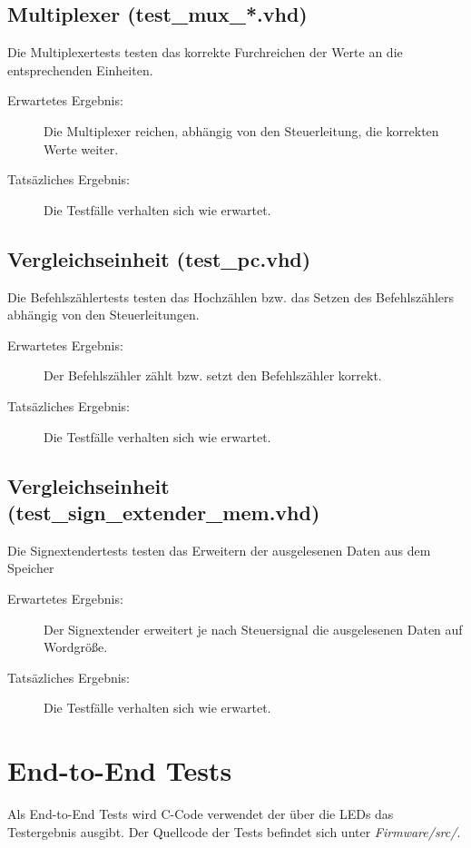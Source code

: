         \subsection{Multiplexer (test\_mux\_*.vhd)}
            Die Multiplexertests testen das korrekte Furchreichen der Werte an die
            entsprechenden Einheiten.
            \begin{description}
                \item[Erwartetes Ergebnis:] Die Multiplexer reichen, abhängig von den Steuerleitung, die korrekten
                Werte weiter.
                \item[Tatsäzliches Ergebnis:] Die Testfälle verhalten sich wie erwartet.
            \end{description}


        \subsection{Vergleichseinheit (test\_pc.vhd)}
            Die Befehlszählertests testen das Hochzählen bzw. das Setzen
            des Befehlszählers abhängig von den Steuerleitungen.
            \begin{description}
                \item[Erwartetes Ergebnis:] Der Befehlszähler zählt bzw. setzt
                den Befehlszähler korrekt. 
                \item[Tatsäzliches Ergebnis:] Die Testfälle verhalten sich wie erwartet.
            \end{description}

        \subsection{Vergleichseinheit (test\_sign\_extender\_mem.vhd)}
            Die Signextendertests testen das Erweitern der ausgelesenen Daten aus dem Speicher
            \begin{description}
                \item[Erwartetes Ergebnis:] Der Signextender erweitert je nach Steuersignal die
                ausgelesenen Daten auf Wordgröße. 
                \item[Tatsäzliches Ergebnis:] Die Testfälle verhalten sich wie erwartet.
            \end{description}

      



    \section{End-to-End Tests}
        Als End-to-End Tests wird C-Code verwendet der über die LEDs das Testergebnis
        ausgibt. Der Quellcode der Tests befindet sich unter \textit{Firmware/src/}.

